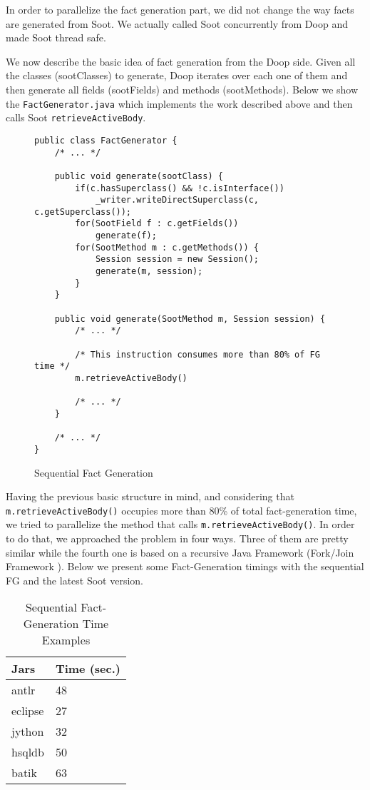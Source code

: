 \documentclass{dithesis}
\begin{document}
    In order to parallelize the fact generation part, we did not change the way facts are generated from Soot. We actually called Soot concurrently from Doop and made Soot thread safe.

    We now describe the basic idea of fact generation from the Doop side. Given all the classes (sootClasses) to generate, Doop iterates over each one of them and then generate all fields (sootFields) and methods (sootMethods). Below we show the \texttt{FactGenerator.java} which implements the work described above and then calls Soot \texttt{retrieveActiveBody}.
    \begin{figure}[H]
\begin{lstlisting}
public class FactGenerator {
    /* ... */

    public void generate(sootClass) {
        if(c.hasSuperclass() && !c.isInterface())
            _writer.writeDirectSuperclass(c, c.getSuperclass());
        for(SootField f : c.getFields())
            generate(f);
        for(SootMethod m : c.getMethods()) {
            Session session = new Session();
            generate(m, session);
        }
    }

    public void generate(SootMethod m, Session session) {
        /* ... */

        /* This instruction consumes more than 80% of FG time */
        m.retrieveActiveBody()

        /* ... */
    }

    /* ... */
}
\end{lstlisting}
    \caption{Sequential Fact Generation}
    \end{figure}

    Having the previous basic structure in mind, and considering that \texttt{m.retrieveActiveBody()} occupies more than 80\% of total fact-generation time, we tried to parallelize the method that calls \texttt{m.retrieveActiveBody()}. In order to do that, we approached the problem in four ways. Three of them are pretty similar while the fourth one is based on a recursive Java Framework (Fork/Join Framework \cite{Oracle Java Fork/Join Framework}). Below we present some Fact-Generation timings with the sequential FG and the latest Soot version.
    \begin{table}[H]
		\centering
        \begin{tabular}{@{}ll@{}}
        \toprule
        \textbf{Jars} & \textbf{Time (sec.)} \\ \midrule
        antlr          & 48                    \\
        eclipse        & 27                    \\
        jython         & 32                    \\
        hsqldb         & 50                    \\
        batik          & 63                    \\ \bottomrule
        \end{tabular}
        \newline
		\caption{Sequential Fact-Generation Time Examples}
	\end{table}
\end{document}
